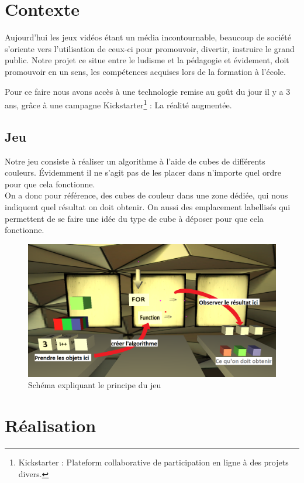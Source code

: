 \documentclass[a4paper,11pt]{myreport}
\begin{document}
\chapter{Contexte}
\par Aujourd'hui les jeux vidéos étant un média incontournable, beaucoup de société s'oriente vers l'utilisation de ceux-ci pour promouvoir, divertir, instruire le grand public. Notre projet ce situe entre le ludisme et la pédagogie et évidement, doit promouvoir en un sens, les compétences acquises lors de la formation à l'école.
\par Pour ce faire nous avons accès à une technologie remise au goût du jour il y a 3 ans, grâce à une campagne Kickstarter\footnote{Kickstarter : Plateform collaborative de participation en ligne à des projets divers.} : La réalité augmentée.

\section*{Jeu}
\par Notre jeu consiste à réaliser un algorithme à l'aide de cubes de différents couleurs. Évidemment il ne s'agit pas de les placer dans n'importe quel ordre pour que cela fonctionne.\\
On a donc pour référence, des cubes de couleur dans une zone dédiée, qui nous indiquent quel résultat on doit obtenir. On aussi des emplacement labellisés qui permettent de se faire une idée du type de cube à déposer pour que cela fonctionne. 
\begin{figure}[h]
	\includegraphics[scale=0.50]{./images/jeu.png}
	\caption{Schéma expliquant le principe du jeu}
	\end{figure}

\chapter{Réalisation}
\end{document}
